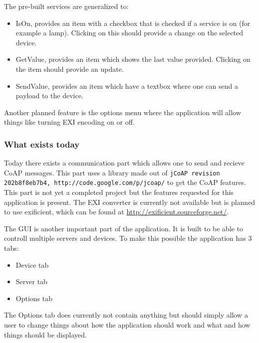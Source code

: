 The pre-built services are generalized to: 
\begin{itemize}
 \item IsOn, provides an item with a checkbox that is checked if a service is on (for example a lamp). Clicking on this should provide a change on the selected device.
 \item GetValue, provides an item which shows the last value provided. Clicking on the item should provide an update.
 \item SendValue, provides an item which have a textbox where one can send a payload to the device. %
\end{itemize}

Another planned feature is the options menu where the application will allow things like turning EXI encoding on or off. 

\subsubsection{What exists today}

Today there exists a communication part which allows one to send and recieve CoAP messages. This part uses a library made out of \texttt{jCoAP revision 202b8f8eb7b4, http://code.google.com/p/jcoap/}%
 to get the CoAP features. This part is not yet a completed project but the features requested for this application is present. The EXI converter is currently not available but is planned to use exificient, 
which can be found at \url{http://exificient.sourceforge.net/}.

The GUI is another important part of the application. It is built to be able to controll multiple servers and devices. 
To make this possible the application has 3 tabs:	%
\begin{itemize}
 \item Device tab
 \item Server tab
 \item Options tab
\end{itemize}

The Options tab does currently not contain anything but should simply allow a user to change things about how the application should work and what and how things should be displayed. 

